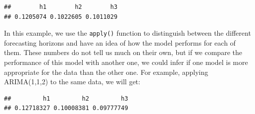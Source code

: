 \documentclass[
]{book}
\newenvironment{Shaded}{\begin{snugshade}}{\end{snugshade}}
\newcommand{\AttributeTok}[1]{\textcolor[rgb]{0.77,0.63,0.00}{#1}}
\newcommand{\ConstantTok}[1]{\textcolor[rgb]{0.00,0.00,0.00}{#1}}
\newcommand{\DecValTok}[1]{\textcolor[rgb]{0.00,0.00,0.81}{#1}}
\newcommand{\FunctionTok}[1]{\textcolor[rgb]{0.00,0.00,0.00}{#1}}
\newcommand{\NormalTok}[1]{#1}
\newcommand{\OtherTok}[1]{\textcolor[rgb]{0.56,0.35,0.01}{#1}}
\newcommand{\SpecialCharTok}[1]{\textcolor[rgb]{0.00,0.00,0.00}{#1}}
\newcommand{\StringTok}[1]{\textcolor[rgb]{0.31,0.60,0.02}{#1}}
\theoremstyle{definition}
\theoremstyle{definition}
\theoremstyle{definition}
\theoremstyle{definition}
\theoremstyle{remark}
\begin{document}
\begin{Shaded}
\end{Shaded}

\begin{verbatim}
##        h1        h2        h3 
## 0.1205074 0.1022605 0.1011029
\end{verbatim}

In this example, we use the \texttt{apply()} function to distinguish between the different forecasting horizons and have an idea of how the model performs for each of them. These numbers do not tell us much on their own, but if we compare the performance of this model with another one, we could infer if one model is more appropriate for the data than the other one. For example, applying ARIMA(1,1,2) to the same data, we will get:

\begin{Shaded}
\end{Shaded}

\begin{verbatim}
##         h1         h2         h3 
## 0.12718327 0.10008381 0.09777749
\end{verbatim}
\end{document}

